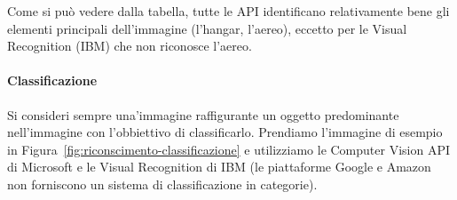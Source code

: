 Come si può vedere dalla tabella, tutte le API identificano relativamente bene gli elementi principali dell'immagine
(l'hangar, l'aereo), eccetto per le Visual Recognition (IBM) che non riconosce l'aereo.
%
\begin{table}[!h]
\centering
{\footnotesize
{}
\caption{Tabella riassuntiva per il riconscimento oggetti e ambientazione.}
\label{tab:riconscimento-oggetti-ambientazione}}
\end{table}
%
\paragraph{Classificazione}\label{par:esempi-classificazione}
Si consideri sempre una'immagine raffigurante un oggetto predominante nell'immagine con l'obbiettivo di classificarlo.
Prendiamo l'immagine di esempio in Figura~\ref{fig:riconscimento-classificazione} e utilizziamo le Computer Vision API
di Microsoft e le Visual Recognition di IBM (le piattaforme Google e Amazon non forniscono un sistema di classificazione in categorie).

